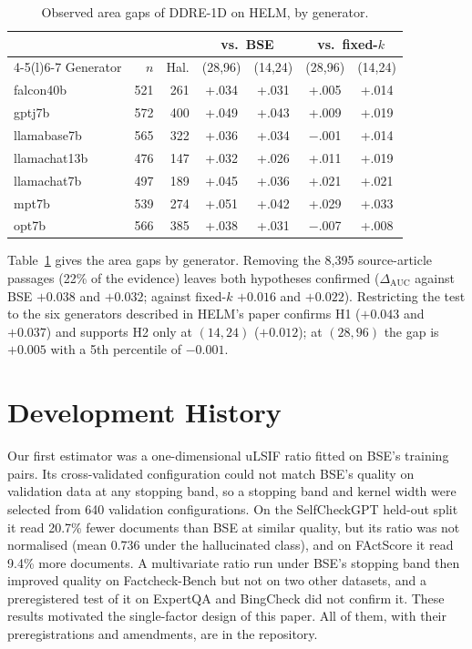 \documentclass[11pt]{article}
\begin{document}
\begin{table}[h]
\centering\small
\setlength{\tabcolsep}{3pt}
\begin{tabular}{@{}lrrcccc@{}}
\toprule
 & & & \multicolumn{2}{c}{vs.\ BSE} & \multicolumn{2}{c}{vs.\ fixed-$k$} \\
\cmidrule(lr){4-5}\cmidrule(l){6-7}
Generator & $n$ & Hal. & (28,96) & (14,24) & (28,96) & (14,24) \\
\midrule
falcon40b & 521 & 261 & +.034 & +.031 & +.005 & +.014 \\
gptj7b & 572 & 400 & +.049 & +.043 & +.009 & +.019 \\
llamabase7b & 565 & 322 & +.036 & +.034 & $-$.001 & +.014 \\
llamachat13b & 476 & 147 & +.032 & +.026 & +.011 & +.019 \\
llamachat7b & 497 & 189 & +.045 & +.036 & +.021 & +.021 \\
mpt7b & 539 & 274 & +.051 & +.042 & +.029 & +.033 \\
opt7b & 566 & 385 & +.038 & +.031 & $-$.007 & +.008 \\
\bottomrule
\end{tabular}
\caption{Observed area gaps of DDRE-1D on HELM, by generator.}
\label{tab:generators}
\end{table}

Table~\ref{tab:generators} gives the area gaps by generator. Removing the 8,395
source-article passages (22\% of the evidence) leaves both hypotheses
confirmed ($\Delta_{\mathrm{AUC}}$ against BSE $+0.038$ and $+0.032$; against
fixed-$k$ $+0.016$ and $+0.022$). Restricting the test to the six generators
described in HELM's paper confirms H1 ($+0.043$ and $+0.037$) and supports H2
only at $(14, 24)$ ($+0.012$); at $(28, 96)$ the gap is $+0.005$ with a 5th
percentile of $-0.001$.

\section{Development History}
\label{app:history}

Our first estimator was a one-dimensional uLSIF ratio fitted on BSE's training
pairs. Its cross-validated configuration could not match BSE's quality on
validation data at any stopping band, so a stopping band and kernel width were
selected from 640 validation configurations. On the SelfCheckGPT held-out split
it read 20.7\% fewer documents than BSE at similar quality, but its ratio was
not normalised (mean 0.736 under the hallucinated class), and on FActScore it
read 9.4\% more documents. A multivariate ratio run under BSE's stopping band
then improved quality on Factcheck-Bench but not on two other datasets, and a
preregistered test of it on ExpertQA and BingCheck did not confirm it. These
results motivated the single-factor design of this paper. All of them, with
their preregistrations and amendments, are in the repository.
\end{document}
